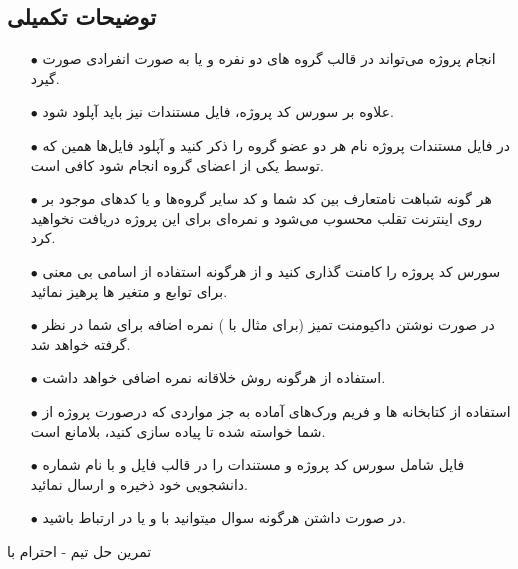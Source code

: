 \documentclass{article}
\begin{document}
	\subsection*{توضیحات تکمیلی}
	\begin{itemize}
		\item [$\bullet$] انجام پروژه می‌تواند در قالب گروه های دو نفره و یا به صورت انفرادی صورت گیرد.
		
		\item [$\bullet$] علاوه بر سورس کد پروژه، فایل مستندات  نیز باید آپلود شود.
		
		\item [$\bullet$] در فایل مستندات پروژه نام هر دو عضو گروه را ذکر کنید و آپلود فایل‌ها همین که توسط یکی از اعضای گروه انجام شود کافی است.
		
		\item [$\bullet$] هر گونه شباهت نامتعارف بین کد شما و کد سایر گروه‌ها و یا کدها‌ی موجود بر روی اینترنت تقلب محسوب می‌شود و نمره‌ای برای این پروژه دریافت نخواهید کرد.
		
		\item [$\bullet$] سورس کد پروژه را کامنت گذاری کنید و از هرگونه استفاده از اسامی بی معنی برای توابع و متغیر ها پرهیز نمائيد.
		
		\item [$\bullet$] در صورت نوشتن داکیومنت تمیز (برای مثال با \lr{\LaTeX}) نمره اضافه برای شما در نظر گرفته خواهد شد.
		
		\item [$\bullet$] استفاده از هرگونه روش خلاقانه نمره اضافی خواهد داشت.
		
		\item [$\bullet$] استفاده از کتابخانه ها و فریم ورک‌های آماده به جز مواردی که درصورت پروژه از شما خواسته شده تا پیاده سازی کنید، بلامانع است.
		
		\item [$\bullet$] فایل شامل سورس کد پروژه و مستندات را در قالب فایل  و با نام شماره دانشجویی خود ذخیره و ارسال نمائید.
		
				\item [$\bullet$] در صورت داشتن هرگونه سوال میتوانید با  و یا  در ارتباط باشید.
				\newline
	\end{itemize}
	
	\begin{LTR}
		
		تمرین حل تیم - احترام با
	\end{LTR}
		

	
\end{document}
